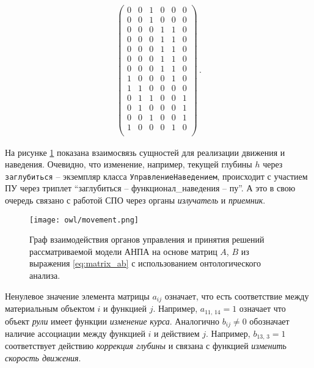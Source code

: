 \begin{equation}
\begin{split}
\begin{pmatrix}
        0 & 0 & 1 & 0 & 0 & 0 \\
        0 & 0 & 1 & 0 & 0 & 0 \\
        0 & 0 & 0 & 1 & 1 & 0 \\
        0 & 0 & 0 & 1 & 1 & 0 \\
        0 & 0 & 0 & 1 & 1 & 0 \\
        0 & 0 & 0 & 1 & 1 & 0 \\
        0 & 0 & 0 & 1 & 1 & 0 \\
        1 & 0 & 0 & 0 & 1 & 0 \\
        1 & 1 & 0 & 0 & 0 & 0 \\
        0 & 1 & 1 & 0 & 0 & 1 \\
        0 & 1 & 0 & 0 & 0 & 1 \\
        0 & 0 & 1 & 0 & 0 & 1 \\
        1 & 0 & 0 & 0 & 1 & 0 \\
    \end{pmatrix}\,.
\end{split}
\end{equation}

На рисунке \ref{fig:owl_ontograph} показана взаимосвязь сущностей для реализации движения и наведения.
Очевидно, что изменение, например, текущей глубины $h$ через \texttt{заглубиться} -- экземпляр класса \texttt{УправлениеНаведением},
происходит с участием ПУ через триплет ``заглубиться -- функционал\_наведения -- пу''.
А это в свою очередь связано с работой СПО через органы \textit{излучатель} и \textit{приемник}.

\begin{landscape}
\begin{center}
    \begin{figure}[h]
        \texttt{[image: owl/movement.png]}
        \caption{Граф взаимодействия органов управления и принятия решений рассматриваемой модели АНПА
                    на основе матриц $A$, $B$ из выражения \ref{eq:matrix_ab} с использованием онтологического анализа.}
            \label{fig:owl_ontograph}
    \end{figure}
\end{center}
\end{landscape}

Ненулевое значение элемента матрицы $a_{ij}$ означает, что есть соответствие между материальным объектом $i$ и функцией $j$.
Например, $a_{11,\,14} = 1$ означает что объект \textit{рули} имеет функции \textit{изменение курса}.
Аналогично $b_{ij} \ne 0$ обозначает наличие ассоциации между функцией $i$ и действием $j$.
Например, $b_{13,\,3} = 1$ соответствует действию \textit{коррекция глубины} и связана с функцией \textit{изменить скорость движения}.


